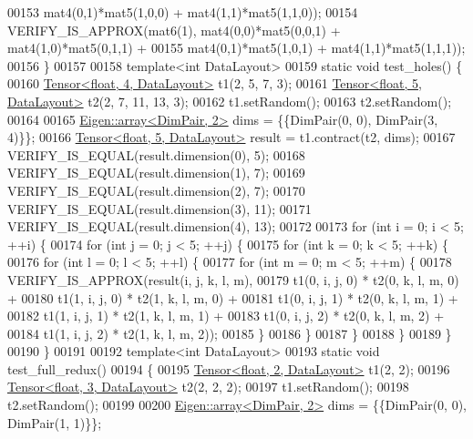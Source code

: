 \begin{DoxyCode}
00153                    mat4(0,1)*mat5(1,0,0) + mat4(1,1)*mat5(1,1,0));
00154   VERIFY\_IS\_APPROX(mat6(1), mat4(0,0)*mat5(0,0,1) + mat4(1,0)*mat5(0,1,1) +
00155                    mat4(0,1)*mat5(1,0,1) + mat4(1,1)*mat5(1,1,1));
00156 \}
00157 
00158 \textcolor{keyword}{template}<\textcolor{keywordtype}{int} DataLayout>
00159 \textcolor{keyword}{static} \textcolor{keywordtype}{void} test\_holes() \{
00160   \hyperlink{class_eigen_1_1_tensor}{Tensor<float, 4, DataLayout>} t1(2, 5, 7, 3);
00161   \hyperlink{class_eigen_1_1_tensor}{Tensor<float, 5, DataLayout>} t2(2, 7, 11, 13, 3);
00162   t1.setRandom();
00163   t2.setRandom();
00164 
00165   \hyperlink{class_eigen_1_1array}{Eigen::array<DimPair, 2>} dims = \{\{DimPair(0, 0), DimPair(3, 4)\}\};
00166   \hyperlink{class_eigen_1_1_tensor}{Tensor<float, 5, DataLayout>} result = t1.contract(t2, dims);
00167   VERIFY\_IS\_EQUAL(result.dimension(0), 5);
00168   VERIFY\_IS\_EQUAL(result.dimension(1), 7);
00169   VERIFY\_IS\_EQUAL(result.dimension(2), 7);
00170   VERIFY\_IS\_EQUAL(result.dimension(3), 11);
00171   VERIFY\_IS\_EQUAL(result.dimension(4), 13);
00172 
00173   \textcolor{keywordflow}{for} (\textcolor{keywordtype}{int} i = 0; i < 5; ++i) \{
00174     \textcolor{keywordflow}{for} (\textcolor{keywordtype}{int} j = 0; j < 5; ++j) \{
00175       \textcolor{keywordflow}{for} (\textcolor{keywordtype}{int} k = 0; k < 5; ++k) \{
00176         \textcolor{keywordflow}{for} (\textcolor{keywordtype}{int} l = 0; l < 5; ++l) \{
00177           \textcolor{keywordflow}{for} (\textcolor{keywordtype}{int} m = 0; m < 5; ++m) \{
00178             VERIFY\_IS\_APPROX(result(i, j, k, l, m),
00179                              t1(0, i, j, 0) * t2(0, k, l, m, 0) +
00180                              t1(1, i, j, 0) * t2(1, k, l, m, 0) +
00181                              t1(0, i, j, 1) * t2(0, k, l, m, 1) +
00182                              t1(1, i, j, 1) * t2(1, k, l, m, 1) +
00183                              t1(0, i, j, 2) * t2(0, k, l, m, 2) +
00184                              t1(1, i, j, 2) * t2(1, k, l, m, 2));
00185           \}
00186         \}
00187       \}
00188     \}
00189   \}
00190 \}
00191 
00192 \textcolor{keyword}{template}<\textcolor{keywordtype}{int} DataLayout>
00193 \textcolor{keyword}{static} \textcolor{keywordtype}{void} test\_full\_redux()
00194 \{
00195   \hyperlink{class_eigen_1_1_tensor}{Tensor<float, 2, DataLayout>} t1(2, 2);
00196   \hyperlink{class_eigen_1_1_tensor}{Tensor<float, 3, DataLayout>} t2(2, 2, 2);
00197   t1.setRandom();
00198   t2.setRandom();
00199 
00200   \hyperlink{class_eigen_1_1array}{Eigen::array<DimPair, 2>} dims = \{\{DimPair(0, 0), DimPair(1, 1)\}\};

\end{DoxyCode}

